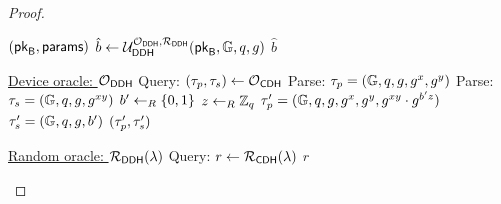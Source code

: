 \begin{proof}
\begin{Algorithm}[]{6cm}
\captionUser
\caption{$\user_{\CDH}$}
\label{alg:DDHadve1}
\begin{algorithmic}[1]
\Require $(\mathsf{pk}_{\mathsf{B}},\mathsf{params})$  
\State $\hat{b}\leftarrow \mathcal{U}_{\mathsf{DDH}}^{\operatorname{\mathcal{O}}_{\mathsf{DDH}},\operatorname{\mathcal{R}}_{\mathsf{DDH}}}(\mathsf{pk}_{\mathsf{B}},\mathbb{G},q,g)$
\State \Ret $\hat{b}$
\Statex\hrulefill
\end{algorithmic}
\begin{algorithmic}[1]
\Statex \underline{Device oracle: \textbf{$\operatorname{\mathcal{O}}_{\mathsf{DDH}}$}}
\Statex
\State Query: $(\tau_p,\tau_s)\leftarrow \operatorname{\mathcal{O}}_{\mathsf{CDH}}$
\State Parse: $\tau_p = (\mathbb{G},q,g,g^x,g^y)$
\State Parse: $\tau_s = (\mathbb{G},q,g,g^{xy})$
\State $b'\leftarrow_R\left\{0,1\right\}$
\State $z\leftarrow_R\mathbb{Z}_q$
\State $\tau_p' = (\mathbb{G},q,g,g^x,g^y,g^{xy}\cdot g^{b'z})$
\State $\tau_s' = (\mathbb{G},q,g,b')$
\State \Ret $(\tau_p',\tau_s')$
\end{algorithmic}
\begin{algorithmic}[1]
\Statex \underline{Random oracle: \textbf{$\operatorname{\mathcal{R}}_{\mathsf{DDH}}(\lambda)$}}
\Statex
\State Query: $r\leftarrow \operatorname{\mathcal{R}}_{\mathsf{CDH}}(\lambda)$
\State \Ret $r$
\end{algorithmic}
\end{Algorithm}


\end{proof}
